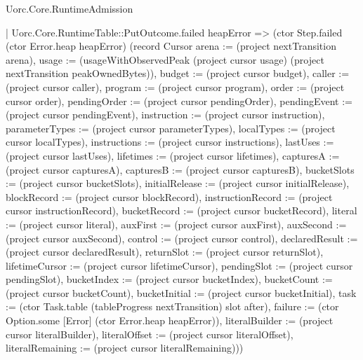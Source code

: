 \begin{lexlean}{Uorc.Core.RuntimeAdmission}
\begin{semanticmodule}
{        | Uorc.Core.RuntimeTable::PutOutcome.failed heapError => (ctor Step.failed (ctor Error.heap heapError) (record Cursor {arena := (project nextTransition arena), usage := (usageWithObservedPeak (project cursor usage) (project nextTransition peakOwnedBytes)), budget := (project cursor budget), caller := (project cursor caller), program := (project cursor program), order := (project cursor order), pendingOrder := (project cursor pendingOrder), pendingEvent := (project cursor pendingEvent), instruction := (project cursor instruction), parameterTypes := (project cursor parameterTypes), localTypes := (project cursor localTypes), instructions := (project cursor instructions), lastUses := (project cursor lastUses), lifetimes := (project cursor lifetimes), capturesA := (project cursor capturesA), capturesB := (project cursor capturesB), bucketSlots := (project cursor bucketSlots), initialRelease := (project cursor initialRelease), blockRecord := (project cursor blockRecord), instructionRecord := (project cursor instructionRecord), bucketRecord := (project cursor bucketRecord), literal := (project cursor literal), auxFirst := (project cursor auxFirst), auxSecond := (project cursor auxSecond), control := (project cursor control), declaredResult := (project cursor declaredResult), returnSlot := (project cursor returnSlot), lifetimeCursor := (project cursor lifetimeCursor), pendingSlot := (project cursor pendingSlot), bucketIndex := (project cursor bucketIndex), bucketCount := (project cursor bucketCount), bucketInitial := (project cursor bucketInitial), task := (ctor Task.table (tableProgress nextTransition) slot after), failure := (ctor Option.some [Error] (ctor Error.heap heapError)), literalBuilder := (project cursor literalBuilder), literalOffset := (project cursor literalOffset), literalRemaining := (project cursor literalRemaining)}))
}
\end{semanticmodule}
\end{lexlean}
